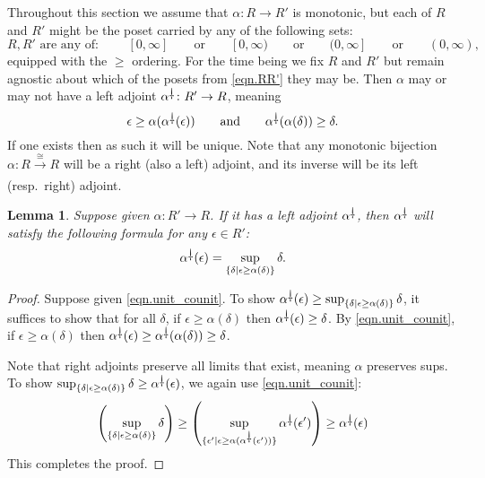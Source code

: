 \documentclass[11pt, one side, article]{memoir}
\theoremstyle{definition}
\theoremstyle{plain}
\newtheorem{lemma}[definitionx]{Lemma}
\newcommand{\To}[2][]{\xrightarrow[#1]{#2}}
\newcommand{\ldag}{^{\rotatebox{180}{$\dagger$}}}
\newcommand{\qqand}{\qquad\text{and}\qquad}
\newcommand{\qqor}{\qquad\text{or}\qquad}
\begin{document}
Throughout this section we assume that $\alpha\colon R\to R'$ is monotonic, but each of $R$ and $R'$ might be the poset carried by any of the following sets:
\begin{equation}\label{eqn.RR'}
	R,R'\text{~are any of:~}\qquad
	[0,\infty]\qqor
	[0,\infty)\qqor
	(0,\infty]\qqor
	(0,\infty),
\end{equation}
equipped with the $\geq$ ordering. For the time being we fix $R$ and $R'$ but remain agnostic about which of the posets from \eqref{eqn.RR'} they may be. Then $\alpha$ may or may not have a left adjoint $\alpha\ldag\colon R'\to R$, meaning
\begin{equation}\label{eqn.unit_counit}
  \epsilon\geq\alpha(\alpha\ldag(\epsilon))
  \qqand
  \alpha\ldag(\alpha(\delta))\geq\delta.
\end{equation}
If one exists then as such it will be unique. Note that any monotonic bijection $\alpha\colon R\To{\cong}R$ will be a right (also a left) adjoint, and its inverse will be its left (resp.\ right) adjoint.

\begin{lemma}\label{lemma.sup_formula}
Suppose given $\alpha\colon R'\to R$. If it has a left adjoint $\alpha\ldag$, then $\alpha\ldag$ will satisfy the following formula for any $\epsilon\in R'$:
\begin{equation}\label{eqn.alpha_left}
  \alpha\ldag(\epsilon)=\sup_{\{\delta\mid \epsilon\geq\alpha(\delta)\}}\delta.
\end{equation}
\end{lemma}
\begin{proof}
Suppose given \eqref{eqn.unit_counit}. To show $\alpha\ldag(\epsilon)\geq\sup_{\{\delta\mid \epsilon\geq\alpha(\delta)\}}\delta$, it suffices to show that for all $\delta$, if $\epsilon\geq\alpha(\delta)$ then $\alpha\ldag(\epsilon)\geq\delta$. By \eqref{eqn.unit_counit}, if $\epsilon\geq\alpha(\delta)$ then $\alpha\ldag(\epsilon)\geq\alpha\ldag(\alpha(\delta))\geq\delta$. 

Note that right adjoints preserve all limits that exist, meaning $\alpha$ preserves sups. To show 
$
\sup_{\{\delta\mid \epsilon\geq\alpha(\delta)\}}\delta
\geq
\alpha\ldag(\epsilon)
$, we again use \eqref{eqn.unit_counit}:
\[
\left(\sup_{\{\delta\mid \epsilon\geq\alpha(\delta)\}}\delta \right)\geq
\left(\sup_{\{\epsilon'\mid \epsilon\geq\alpha(\alpha\ldag(\epsilon'))\}}\alpha\ldag(\epsilon')\right)\geq\alpha\ldag(\epsilon)
\]
This completes the proof.
\end{proof}
\end{document}
